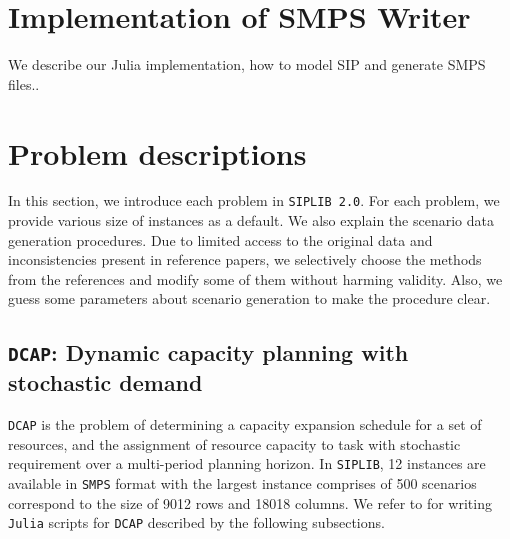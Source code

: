 \section{Implementation of SMPS Writer}

We describe our Julia implementation, how to model SIP and generate SMPS files..

\section{Problem descriptions} \label{sec:prob_desc}

In this section, we introduce each problem in \texttt{SIPLIB 2.0}.  For each problem, we provide various size of instances as a default. We also explain the scenario data generation procedures. Due to limited access to the original data and inconsistencies present in reference papers, we selectively choose the methods from the references and modify some of them without harming validity. Also, we guess some parameters about scenario generation to make the procedure clear.  %

\subsection{\texttt{DCAP}: Dynamic capacity planning with stochastic demand}
\texttt{DCAP} is the problem of determining a capacity expansion schedule for a set of resources, and the assignment of resource capacity to task with stochastic requirement over a multi-period planning horizon. In \texttt{SIPLIB}, 12 instances are available in \texttt{SMPS} format with the largest instance comprises of 500 scenarios correspond to the size of 9012 rows and 18018 columns. We refer to \cite{journal:AG2004} for writing \texttt{Julia} scripts for \texttt{DCAP} described by the following subsections.
